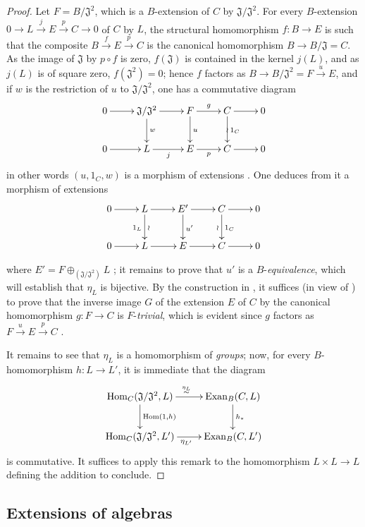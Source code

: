 \begin{proof}
Let $F=B/\mathfrak{J}^2$, which is a $B$-extension of $C$ by $\mathfrak{J}/\mathfrak{J}^2$.
For every $B$-extension
$0\to L\xrightarrow{j} E\xrightarrow{p} C\to 0$ of $C$ by $L$, the structural homomorphism $f:B\to E$ is such that the composite $B\xrightarrow{f} E\xrightarrow{p} C$ is the canonical homomorphism $B\to B/\mathfrak{J}=C$.
As the image of $\mathfrak{J}$ by $p\circ f$ is zero, $f(\mathfrak{J})$ is contained in the kernel $j(L)$, and as $j(L)$ is of square zero, $f(\mathfrak{J}^2)=0$; hence $f$ factors as $B\to B/\mathfrak{J}^2=F\xrightarrow{u} E$, and if $w$ is the restriction of $u$ to $\mathfrak{J}/\mathfrak{J}^2$, one has a commutative diagram
\[
  \xymatrix{
    0\ar[r] & \mathfrak{J}/\mathfrak{J}^2\ar[r]\ar[d]^w & F\ar[r]^g\ar[d]^u & C\ar[r]\ar[d]^{1_C}\ar@{}[d]|{\wr} & 0\\
    0\ar[r] & L\ar[r]_j & E\ar[r]_p & C\ar[r] & 0
  }
\]
in other words $(u,1_C,w)$ is a morphism of extensions .
One deduces from it a morphism of extensions
\[
  \xymatrix{
    0\ar[r] & L\ar[r]\ar[d]_{1_L}^{\wr} & E'\ar[r]\ar[d]^{u'} & C\ar[r]\ar[d]^{1_C}_{\wr} & 0\\
    0\ar[r] & L\ar[r] & E\ar[r] & C\ar[r] & 0
  }
\]

where $E'=F\oplus_{(\mathfrak J/\mathfrak J^2)}L$ ; it remains to prove that $u'$ is a $B$-\emph{equivalence}, which will establish that $\eta_L$ is bijective.
By the construction in , it suffices (in view of ) to prove that the inverse image $G$ of the extension $E$ of $C$ by the canonical homomorphism $g:F\to C$ is $F$-\emph{trivial}, which is evident since $g$ factors as $F\xrightarrow{u} E\xrightarrow{p} C$ .

It remains to see that $\eta_L$ is a homomorphism of \emph{groups}; now, for every $B$-homomorphism $h:L\to L'$, it is immediate that the diagram
\[
  \xymatrix{
    \operatorname{Hom}_C(\mathfrak{J}/\mathfrak{J}^2,L)\ar[r]^{\overset{\eta_L}{\sim}}\ar[d]^{\operatorname{Hom}(1,h)} & \operatorname{Exan}_B(C,L)\ar[d]^{h_*}\\
    \operatorname{Hom}_C(\mathfrak{J}/\mathfrak{J}^2,L')\ar[r]_{\eta_{L'}} & \operatorname{Exan}_B(C,L')
  }
\]
is commutative.
It suffices to apply this remark to the homomorphism $L\times L\to L$ defining the addition to conclude.
\end{proof}

\subsection{Extensions of algebras}
\label{subsection:0.18.4}

